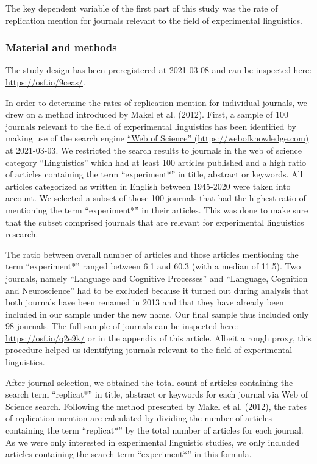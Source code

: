 \documentclass[]{elsarticle} %
\begin{document}
The key dependent variable of the first part of this study was the rate
of replication mention for journals relevant to the field of
experimental linguistics.

\hypertarget{material-and-methods}{%
\subsubsection{Material and methods}\label{material-and-methods}}

The study design has been preregistered at 2021-03-08 and can be
inspected \href{https://osf.io/9ceas/}{here: https://osf.io/9ceas/}.

In order to determine the rates of replication mention for individual
journals, we drew on a method introduced by Makel et al. (2012). First,
a sample of 100 journals relevant to the field of experimental
linguistics has been identified by making use of the search engine
\href{https://webofknowledge.com}{``Web of Science''
(https://webofknowledge.com)} at 2021-03-03. We restricted the search
results to journals in the web of science category ``Linguistics'' which
had at least 100 articles published and a high ratio of articles
containing the term ``experiment*'' in title, abstract or keywords. All
articles categorized as written in English between 1945-2020 were taken
into account. We selected a subset of those 100 journals that had the
highest ratio of mentioning the term ``experiment*'' in their articles.
This was done to make sure that the subset comprised journals that are
relevant for experimental linguistics research.

The ratio between overall number of articles and those articles
mentioning the term ``experiment*'' ranged between 6.1 and 60.3 (with a
median of 11.5). Two journals, namely ``Language and Cognitive
Processes'' and ``Language, Cognition and Neuroscience'' had to be
excluded because it turned out during analysis that both journals have
been renamed in 2013 and that they have already been included in our
sample under the new name. Our final sample thus included only 98
journals. The full sample of journals can be inspected
\href{https://osf.io/q2e9k/}{here: https://osf.io/q2e9k/} or in the
appendix of this article. Albeit a rough proxy, this procedure helped us
identifying journals relevant to the field of experimental linguistics.

After journal selection, we obtained the total count of articles
containing the search term ``replicat*'' in title, abstract or keywords
for each journal via Web of Science search. Following the method
presented by Makel et al. (2012), the rates of replication mention are
calculated by dividing the number of articles containing the term
``replicat*'' by the total number of articles for each journal. As we
were only interested in experimental linguistic studies, we only
included articles containing the search term ``experiment*'' in this
formula.
\end{document}
